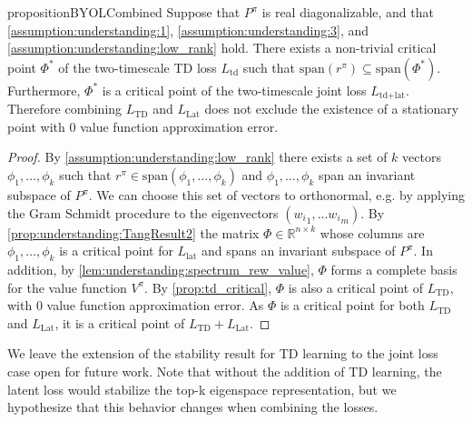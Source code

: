 \begin{restatable}{proposition}{BYOLCombined}\label{prop:understanding:BYOLCombined}
    Suppose that $P^\pi$ is real diagonalizable, and that \autoref{assumption:understanding:1}, \autoref{assumption:understanding:3}, and \autoref{assumption:understanding:low_rank} hold. 
    There exists a non-trivial critical point $\Phi^*$ of the two-timescale TD loss $L_\text{td}$ such that $\mathrm{span}(r^\pi)\subseteq \mathrm{span}(\Phi^*)$. 
    Furthermore, $\Phi^*$ is a critical point of the two-timescale joint loss $L_{\text{td}+\text{lat}}$. Therefore combining $L_\text{TD}$ and $L_\text{Lat}$ does not exclude the existence of a stationary point with $0$ value function approximation error.
\end{restatable}
\begin{proof}
        By \autoref{assumption:understanding:low_rank} there exists a set of $k$ vectors $\phi_1,\dots,\phi_k$ such that $r^\pi \in \text{span}(\phi_1,\dots,\phi_k)$ and $\phi_1,\dots,\phi_k$ span an invariant subspace of $P^\pi$.
        We can choose this set of vectors to orthonormal, e.g. by applying the Gram Schmidt procedure to the eigenvectors $({w_i}_1,\dots{w_i}_m)$. 
        By \autoref{prop:understanding:TangResult2} the matrix $\Phi\in \mathbb{R}^{n\times k}$ whose columns are $\phi_1,\dots,\phi_k$ is a critical point for $L_\text{lat}$ and spans an invariant subspace of $P^\pi$.
        In addition, by \autoref{lem:understanding:spectrum_rew_value}, $\Phi$ forms a complete basis for the value function $V^\pi$.
        By \autoref{prop:td_critical}, $\Phi$ is also a critical point of $L_\text{TD}$, with $0$ value function approximation error. 
        As $\Phi$ is a critical point for both $L_\text{TD}$ and $L_\text{Lat}$, it is a critical point of $L_\text{TD} + L_\text{Lat}$.
\end{proof}


We leave the extension of the stability result for TD learning to the joint loss case open for future work.
Note that without the addition of TD learning, the latent loss would stabilize the top-k eigenspace representation, but we hypothesize that this behavior changes when combining the losses.

